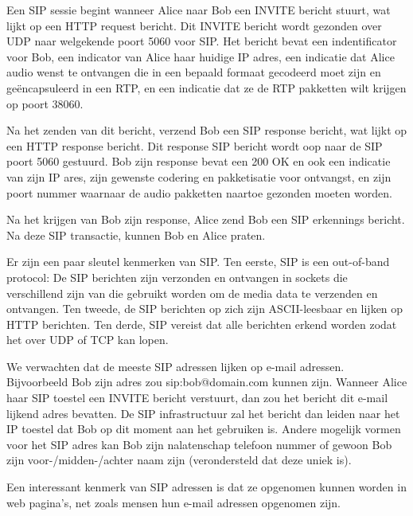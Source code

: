 
\noindent Een SIP sessie begint wanneer Alice naar Bob een INVITE bericht stuurt, wat lijkt op een HTTP request bericht. Dit INVITE bericht wordt gezonden over UDP naar welgekende poort 5060 voor SIP. Het bericht bevat een indentificator voor Bob, een indicator van Alice haar huidige IP adres, een indicatie dat Alice audio wenst te ontvangen die in een bepaald formaat gecodeerd moet zijn en geëncapsuleerd in een RTP, en een indicatie dat ze de RTP pakketten wilt krijgen op poort 38060. 

\noindent Na het zenden van dit bericht, verzend Bob een SIP response bericht, wat lijkt op een HTTP response bericht. Dit response SIP bericht wordt oop naar de SIP poort 5060 gestuurd. Bob zijn response bevat een 200 OK en ook een indicatie van zijn IP ares, zijn gewenste codering en pakketisatie voor ontvangst, en zijn poort nummer waarnaar de audio pakketten naartoe gezonden moeten worden.

\newpage

\noindent Na het krijgen van Bob zijn response, Alice zend Bob een SIP erkennings bericht. Na deze SIP transactie, kunnen Bob en Alice praten.

\noindent Er zijn een paar sleutel kenmerken van SIP. Ten eerste, SIP is een out-of-band protocol: De SIP berichten zijn verzonden en ontvangen in sockets die verschillend zijn van die gebruikt worden om de media data te verzenden en ontvangen. Ten tweede, de SIP berichten op zich zijn ASCII-leesbaar en lijken op HTTP berichten. Ten derde, SIP vereist dat alle berichten erkend worden zodat het over UDP of TCP kan lopen.


\noindent We verwachten dat de meeste SIP adressen lijken op e-mail adressen. Bijvoorbeeld Bob zijn adres zou sip:bob@domain.com kunnen zijn. Wanneer Alice haar SIP toestel een INVITE bericht verstuurt, dan zou het bericht dit e-mail lijkend adres bevatten. De SIP infrastructuur zal het bericht dan leiden naar het IP toestel dat Bob op dit moment aan het gebruiken is. Andere mogelijk vormen voor het SIP adres kan Bob zijn nalatenschap telefoon nummer of gewoon Bob zijn voor-/midden-/achter naam zijn (verondersteld dat deze uniek is).

\noindent Een interessant kenmerk van SIP adressen is dat ze opgenomen kunnen worden in web pagina’s, net zoals mensen hun e-mail adressen opgenomen zijn.



